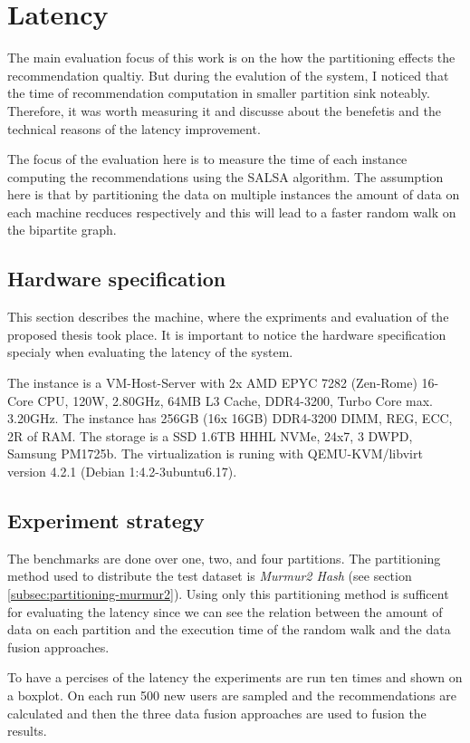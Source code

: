 \section{Latency}
\label{sec:eval-latency}
The main evaluation focus of this work is on the how the partitioning effects the recommendation qualtiy. But during the evalution of the system, I noticed that the time of recommendation computation in smaller partition sink noteably. Therefore, it was worth measuring it and discusse about the benefetis and the technical reasons of the latency improvement.


The focus of the evaluation here is to measure the time of each instance computing the recommendations using the SALSA algorithm. The assumption here is that by partitioning the data on multiple instances the amount of data on each machine recduces respectively and this will lead to a faster random walk on the bipartite graph. 

\subsection{Hardware specification}
\label{subsec:hardware-spec}
This section describes the machine, where the expriments and evaluation of the proposed thesis took place. It is important to notice the hardware specification specialy when evaluating the latency of the system.

The instance is a VM-Host-Server with 2x AMD EPYC 7282 (Zen-Rome) 16-Core CPU, 120W, 2.80GHz, 64MB L3 Cache, DDR4-3200, Turbo Core max. 3.20GHz. The instance has 256GB (16x 16GB) DDR4-3200 DIMM, REG, ECC, 2R of RAM. The storage is a SSD 1.6TB HHHL NVMe, 24x7, 3 DWPD, Samsung PM1725b. The virtualization is runing with  QEMU-KVM/libvirt version 4.2.1 (Debian 1:4.2-3ubuntu6.17).


\subsection{Experiment strategy}
\label{subsec:latency-experiment-strategy}
The benchmarks are done over one, two, and four partitions. The partitioning method used to distribute the test dataset is \emph{Murmur2 Hash} (see section \ref{subsec:partitioning-murmur2}). Using only this partitioning method is sufficent for evaluating the latency since we can see the relation between the amount of data on each partition and the execution time of the random walk and the data fusion approaches.

To have a percises of the latency the experiments are run ten times and shown on a boxplot. On each run 500 new users are sampled and the recommendations are calculated and then the three data fusion approaches are used to fusion the results.


